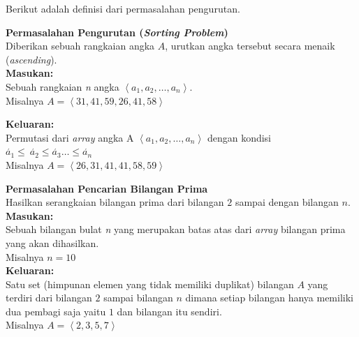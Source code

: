 Berikut adalah definisi dari permasalahan pengurutan.
\begin{contoh}
\label{cth:pengurutan}
\textbf{Permasalahan Pengurutan (\textit{Sorting Problem})}\\
Diberikan sebuah rangkaian angka $A$, urutkan angka tersebut secara menaik (\textit{ascending}).\\
\textbf{Masukan:}\\
Sebuah rangkaian \textit{n} angka $\left\langle a_{1},a_{2},\ldots,a_{n} \right\rangle$.\\
Misalnya $A = \left\langle 31,41,59,26,41,58 \right\rangle$

\textbf{Keluaran:}\\ 
Permutasi dari \textit{array} angka A $\left\langle a_{1},a_{2},\ldots,a_{n}\right\rangle$ dengan kondisi $\acute{a_{1}} \leq\ \acute{a_{2}} \leq \acute{a_{3}} \ldots \leq \acute{a_{n}}$ \\
Misalnya $A = \left\langle 26,31,41,41,58,59 \right\rangle$
\end{contoh}

\begin{contoh}
\label{cth:prima}
\textbf{Permasalahan Pencarian Bilangan Prima}\\
Hasilkan serangkaian bilangan prima dari bilangan $2$ sampai dengan bilangan $n$.\\  
\textbf{Masukan:}\\
Sebuah bilangan bulat \textit{n} yang merupakan batas atas dari \textit{array} bilangan prima yang akan dihasilkan.\\
Misalnya $n = 10$\\
\textbf{Keluaran:}\\
Satu set (himpunan elemen yang tidak memiliki duplikat) bilangan $A$ yang terdiri dari bilangan $2$ sampai bilangan $n$ dimana setiap bilangan hanya memiliki dua pembagi saja yaitu $1$ dan bilangan itu sendiri.\\
Misalnya $A = \left\langle 2,3,5,7 \right\rangle$\\
\end{contoh}

